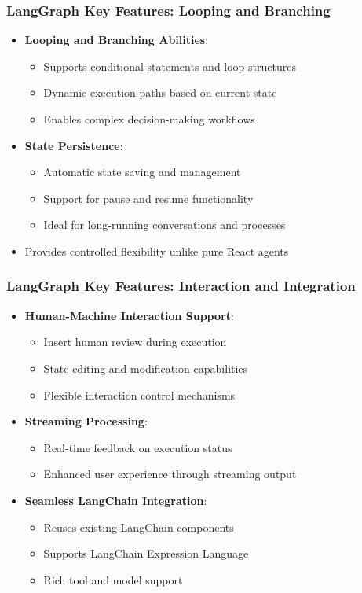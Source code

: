 \begin{frame}[fragile]\frametitle{LangGraph Key Features: Looping and Branching}
      \begin{itemize}
        \item \textbf{Looping and Branching Abilities}:
        \begin{itemize}
            \item Supports conditional statements and loop structures
            \item Dynamic execution paths based on current state
            \item Enables complex decision-making workflows
        \end{itemize}
        \item \textbf{State Persistence}:
        \begin{itemize}
            \item Automatic state saving and management
            \item Support for pause and resume functionality
            \item Ideal for long-running conversations and processes
        \end{itemize}
        \item Provides controlled flexibility unlike pure React agents
      \end{itemize}
\end{frame}

\begin{frame}[fragile]\frametitle{LangGraph Key Features: Interaction and Integration}
      \begin{itemize}
        \item \textbf{Human-Machine Interaction Support}:
        \begin{itemize}
            \item Insert human review during execution
            \item State editing and modification capabilities
            \item Flexible interaction control mechanisms
        \end{itemize}
        \item \textbf{Streaming Processing}:
        \begin{itemize}
            \item Real-time feedback on execution status
            \item Enhanced user experience through streaming output
        \end{itemize}
        \item \textbf{Seamless LangChain Integration}:
        \begin{itemize}
            \item Reuses existing LangChain components
            \item Supports LangChain Expression Language
            \item Rich tool and model support
        \end{itemize}
      \end{itemize}
\end{frame}

